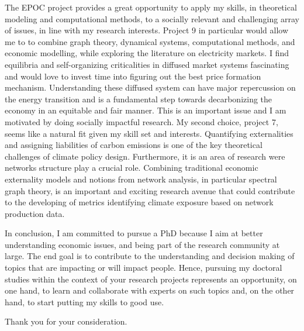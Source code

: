 \documentclass{letter}
\begin{document}
\begin{letter}{}
\begin{adjustwidth}{-30pt}{-30pt}
        The EPOC project provides a great opportunity to apply my skills, in theoretical modeling and computational methods, to a socially relevant and challenging array of issues, in line with my research interests. Project 9 in particular would allow me to to combine graph theory, dynamical systems, computational methods, and economic modelling, while exploring the literature on electricity markets. I find equilibria and self-organizing criticalities in diffused market systems fascinating and would love to invest time into figuring out the best price formation mechanism. Understanding these diffused system can have major repercussion on the energy transition and is a fundamental step towards decarbonizing the economy in an equitable and fair manner. This is an important issue and I am motivated by doing socially impactful research. My second choice, project 7, seems like a natural fit given my skill set and interests. Quantifying externalities and assigning liabilities of carbon emissions is one of the key theoretical challenges of climate policy design. Furthermore, it is an area of research were networks structure play a crucial role. Combining traditional economic externality models and notions from network analysis, in particular spectral graph theory, is an important and exciting research avenue that could contribute to the developing of metrics identifying climate exposure based on network production data.

        In conclusion, I am committed to pursue a PhD because I aim at better understanding economic issues, and being part of the research community at large. The end goal is to contribute to the understanding and decision making of topics that are impacting or will impact people. Hence, pursuing my doctoral studies within the context of your research projects represents an opportunity, on one hand, to learn and collaborate with experts on such topics and, on the other hand, to start putting my skills to good use.
        \closing{Thank you for your consideration.}
    \end{adjustwidth}

\end{letter}
\end{document}
